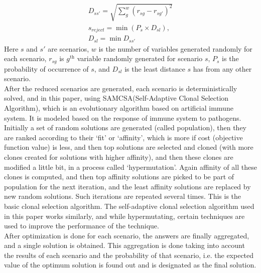 \begin{eqnarray}
\label{eq:pap2dee'}
D_{ss'} = \sqrt{\sum\limits_{g}^{w}(r_{sg}-r_{sg'})^2}\\
\label{eq:pap2rej}
s_{reject} = \min(P_s \times D_{sl}),\\
D_{sl} = \min{D_{ss'}}
\end{eqnarray}
Here $s$ and $s'$ are scenarios, $w$ is the number of variables generated randomly for each scenario, $r_{sg}$ is $g^{\text{th}}$ variable randomly generated for scenario $s$, $P_s$ is the probability of occurrence of $s$, and $D_{sl}$ is the least distance $s$ has from any other scenario.\\ 
After the reduced scenarios are generated, each scenario is deterministically solved, and in this paper, using SAMCSA(Self-Adaptive Clonal Selection Algorithm), which is an evolutionary algorithm based on artificial immune system. It is modeled based on the response of immune system to pathogens. Initially a set of random solutions are generated (called population), then they are ranked according to their `fit' or `affinity', which is more if cost (objective function value) is less, and then top solutions are selected and cloned (with more clones created for solutions with higher affinity), and then these clones are modified a little bit, in a process called `hypermutation'. Again affinity of all these clones is computed, and then top affinity solutions are picked to be part of population for the next iteration, and the least affinity solutions are replaced by new random solutions. Such iterations are repeated several times. This is the basic clonal selection algorithm. The self-adaptive clonal selection algorithm used in this paper works similarly, and while hypermutating, certain techniques are used to improve the performance of the technique.\\
After optimization is done for each scenario, the answers are finally aggregated, and a single solution is obtained. This aggregation is done taking into account the results of each scenario and the probability of that scenario, i.e. the expected value of the optimum solution is found out and is designated as the final solution.
